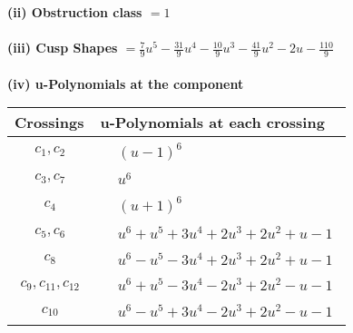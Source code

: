 \documentclass[1p]{elsarticle_modified}
\theoremstyle{definition}
\begin{document}
\flushleft \textbf{(ii) Obstruction class $= 1$}\\~\\
\flushleft \textbf{(iii) Cusp Shapes $= \frac{7}{9} u^5-\frac{31}{9} u^4-\frac{10}{9} u^3-\frac{41}{9} u^2-2 u-\frac{110}{9}$}\\~\\
\newpage\renewcommand{\arraystretch}{1}
\flushleft \textbf{(iv) u-Polynomials at the component}\newline \\
\begin{tabular}{m{50pt}|m{274pt}}
Crossings & \hspace{64pt}u-Polynomials at each crossing \\
\hline $$\begin{aligned}c_{1},c_{2}\end{aligned}$$&$\begin{aligned}
&(u-1)^6
\end{aligned}$\\
\hline $$\begin{aligned}c_{3},c_{7}\end{aligned}$$&$\begin{aligned}
&u^6
\end{aligned}$\\
\hline $$\begin{aligned}c_{4}\end{aligned}$$&$\begin{aligned}
&(u+1)^6
\end{aligned}$\\
\hline $$\begin{aligned}c_{5},c_{6}\end{aligned}$$&$\begin{aligned}
&u^6+u^5+3 u^4+2 u^3+2 u^2+u-1
\end{aligned}$\\
\hline $$\begin{aligned}c_{8}\end{aligned}$$&$\begin{aligned}
&u^6- u^5-3 u^4+2 u^3+2 u^2+u-1
\end{aligned}$\\
\hline $$\begin{aligned}c_{9},c_{11},c_{12}\end{aligned}$$&$\begin{aligned}
&u^6+u^5-3 u^4-2 u^3+2 u^2- u-1
\end{aligned}$\\
\hline $$\begin{aligned}c_{10}\end{aligned}$$&$\begin{aligned}
&u^6- u^5+3 u^4-2 u^3+2 u^2- u-1
\end{aligned}$\\
\hline
\end{tabular}\\~\\
\end{document}

